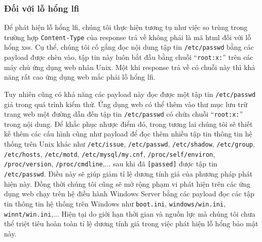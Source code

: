\subsubsection{Đối với lỗ hổng \acrlong{lfi}}
Để phát hiện lỗ hổng \acrshort{lfi}, chúng tôi thực hiện tương tụ như việc so trùng trong trường hợp \texttt{Content-Type} của response trả về không phải là mã \acrshort{html} đối với lỗ hổng \acrshort{xss}. Cụ thể, chúng tôi cố gắng đọc nội dung tập tin \texttt{/etc/passwd} bằng các payload được chèn vào, tập tin này luôn bắt đầu bằng chuỗi ``\texttt{root:x:}'' trên các máy chủ ứng dụng web nhân Unix. Một khi response trả về có chuỗi này thì khả năng rất cao ứng dụng web mắc phải lỗ hổng \acrshort{lfi}.\par
Tuy nhiên cũng có khả năng các payload này đọc được một tập tin \texttt{/etc/passwd} giả trong quá trình kiểm thử. Ứng dụng web có thể thêm vào thư mục lưu trữ trang web một đường dẫn đến tập tin \texttt{/etc/passwd} có chứa chuỗi ``\texttt{root:x:}'' trong nội dung. Để khắc phục nhược điểm đó, trong tương lai chúng tôi sẽ thiết kế thêm các cấu hình cũng như payload để đọc thêm nhiều tập tin thông tin hệ thống trên Unix khác như \texttt{/etc/issue}, \texttt{/etc/passwd}, \texttt{/etc/shadow}, \texttt{/etc/group}, \texttt{/etc/hosts}, \texttt{/etc/motd}, \texttt{/etc/mysql/my.cnf}, \texttt{/proc/self/environ}, \texttt{/proc/version}, \texttt{/proc/cmdline},... sau khi đã \texttt{[passed]} được tập tin \texttt{/etc/passwd}. Điều này sẽ giúp giảm tỉ lệ dương tính giả của phương pháp phát hiện này. Đồng thời chúng tôi cũng sẽ mở rộng phạm vi phát hiện trên các ứng dụng web chạy trên hệ điều hành Windows Server bằng các payload đọc các tập tin thông tin hệ thống trên Windows như \texttt{boot.ini}, \texttt{windows/win.ini}, \texttt{winnt/win.ini},... Hiện tại do giới hạn thời gian và nguồn lực mà chúng tôi chưa thể triệt tiêu hoàn toàn tỉ lệ dương tính giả trong việc phát hiện lỗ hổng bảo mật này.


